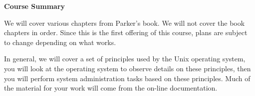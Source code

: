 \vskip 6pt
\centerline{\bf Course Summary}

We will cover various chapters from Parker's book.
We will not cover the book chapters in order.
Since this is the first offering of this course,
plans are subject to change depending on what works.

In general, we will cover a set of principles used by the Unix operating system,
you will look at the operating system to observe details on these principles,
then you will perform system administration tasks based on these principles.
Much of the material for your work will come from the on-line documentation.

%
%
{\parskip=0pt

\def\week#1{\par\hangindent 0.7in {\indent\llap{\bf #1 \enspace}
\ignorespaces}}

}
\bye
